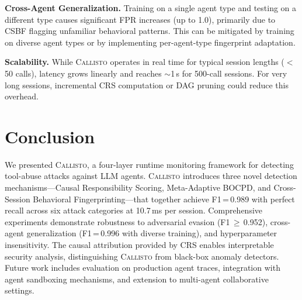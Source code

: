 \documentclass[conference,compsoc]{IEEEtran}
\newcommand{\system}{\textsc{Callisto}}
\begin{document}
\textbf{Cross-Agent Generalization.} Training on a single agent type and testing on a different type causes significant FPR increases (up to 1.0), primarily due to CSBF flagging unfamiliar behavioral patterns. This can be mitigated by training on diverse agent types or by implementing per-agent-type fingerprint adaptation.

\textbf{Scalability.} While \system{} operates in real time for typical session lengths ($<$50 calls), latency grows linearly and reaches $\sim$1\,s for 500-call sessions. For very long sessions, incremental CRS computation or DAG pruning could reduce this overhead.

\section{Conclusion}
\label{sec:conclusion}

We presented \system{}, a four-layer runtime monitoring framework for detecting tool-abuse attacks against LLM agents. \system{} introduces three novel detection mechanisms---Causal Responsibility Scoring, Meta-Adaptive BOCPD, and Cross-Session Behavioral Fingerprinting---that together achieve F1\,=\,0.989 with perfect recall across six attack categories at 10.7\,ms per session. Comprehensive experiments demonstrate robustness to adversarial evasion (F1\,$\geq$\,0.952), cross-agent generalization (F1\,=\,0.996 with diverse training), and hyperparameter insensitivity. The causal attribution provided by CRS enables interpretable security analysis, distinguishing \system{} from black-box anomaly detectors. Future work includes evaluation on production agent traces, integration with agent sandboxing mechanisms, and extension to multi-agent collaborative settings.

\end{document}
